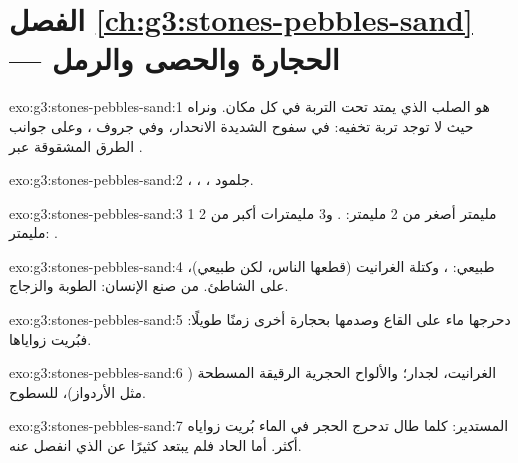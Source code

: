 \section*{الفصل \ref{ch:g3:stones-pebbles-sand} --- الحجارة والحصى والرمل}

\begin{solution}{exo:g3:stones-pebbles-sand:1}
 هو  الصلب الذي يمتد تحت التربة في كل مكان. ونراه حيث
لا توجد تربة تخفيه: في سفوح  الشديدة الانحدار، وفي جروف ، وعلى
جوانب الطرق المشقوقة عبر .
\end{solution}

\begin{solution}{exo:g3:stones-pebbles-sand:2}
، ، ، جلمود.
\end{solution}

\begin{solution}{exo:g3:stones-pebbles-sand:3}
1 مليمتر أصغر من 2 مليمتر: . و3 مليمترات أكبر
من 2 مليمتر: .
\end{solution}

\begin{solution}{exo:g3:stones-pebbles-sand:4}
طبيعي: ، وكتلة الغرانيت (قطعها الناس، لكن  طبيعي)،  على
الشاطئ. من صنع الإنسان: الطوبة والزجاج.
\end{solution}

\begin{solution}{exo:g3:stones-pebbles-sand:5}
دحرجها ماء  على القاع وصدمها بحجارة أخرى زمنًا طويلًا: فبُريت
زواياها.
\end{solution}

\begin{solution}{exo:g3:stones-pebbles-sand:6}
الغرانيت، لجدار؛ والألواح الحجرية الرقيقة المسطحة ( مثل الأردواز)، للسطوح.
\end{solution}

\begin{solution}{exo:g3:stones-pebbles-sand:7}
المستدير: كلما طال تدحرج الحجر في الماء بُريت زواياه أكثر. أما الحاد
فلم يبتعد كثيرًا عن  الذي انفصل عنه.
\end{solution}

